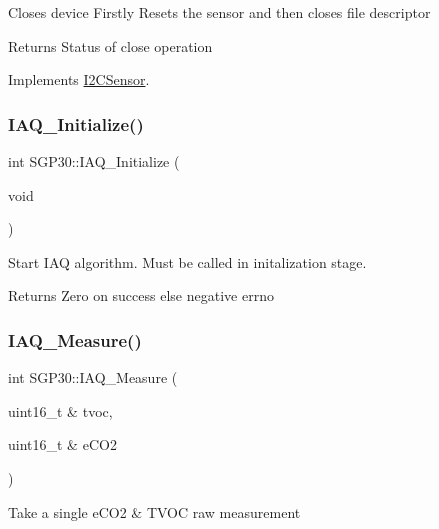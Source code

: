 Closes device Firstly Resets the sensor and then closes file descriptor

\begin{DoxyReturn}{Returns}
Status of close operation 
\end{DoxyReturn}


Implements \hyperlink{classI2CSensor_acee1633439e97bae412441ac085fabba}{I2\+C\+Sensor}.

\mbox{\label{classSGP30_a4419a25b8e25a133c3cfc876b3443669}} 
\subsubsection{\texorpdfstring{I\+A\+Q\+\_\+\+Initialize()}{IAQ\_Initialize()}}
{\footnotesize\ttfamily int S\+G\+P30\+::\+I\+A\+Q\+\_\+\+Initialize (\begin{DoxyParamCaption}\item[{void}]{ }\end{DoxyParamCaption})\hspace{0.3cm}{\ttfamily [private]}}

Start I\+AQ algorithm. Must be called in initalization stage.

\begin{DoxyReturn}{Returns}
Zero on success else negative errno 
\end{DoxyReturn}
\mbox{\label{classSGP30_ac43bc058d733c27c6356ece89730232c}} 
\subsubsection{\texorpdfstring{I\+A\+Q\+\_\+\+Measure()}{IAQ\_Measure()}}
{\footnotesize\ttfamily int S\+G\+P30\+::\+I\+A\+Q\+\_\+\+Measure (\begin{DoxyParamCaption}\item[{uint16\+\_\+t \&}]{tvoc,  }\item[{uint16\+\_\+t \&}]{e\+C\+O2 }\end{DoxyParamCaption})}

Take a single e\+C\+O2 \& T\+V\+OC raw measurement


